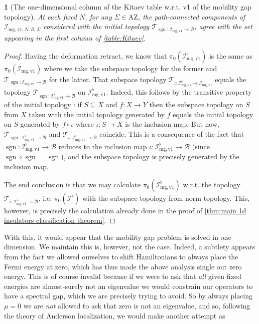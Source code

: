 \documentclass[a4paper,10pt]{article}
\numberwithin{equation}{section}
\theoremstyle{plain}
\theoremstyle{plain}
\theoremstyle{plain}
\newtheorem{cor}[thm]{\protect\corollaryname}
\theoremstyle{plain}
\theoremstyle{plain}
\theoremstyle{remark}
\theoremstyle{definition}
\theoremstyle{plain}
\providecommand{\corollaryname}{Corollary}
\newcommand{\calB}{\mathcal{B}}
\newcommand{\calI}{\mathcal{I}}
\newcommand{\sgn}{\operatorname{sgn}}
\newcommand{\calT}{\mathcal{T}}
\begin{document}
	\begin{cor}[The one-dimensional column of the Kitaev table w.r.t. v1 of the mobility gap topology]\label{thm:main 1d insulators classification theorem for mgv1} At each fixed $N$, for any $\Sigma\in\mathrm{AZ}$, the path-connected components of $\calI_{\mathrm{mg,v1},N,B,\Sigma}$ considered with the initial topology $\calT_{\sgn:\calI_{\mathrm{mg,v1}}\to\calB}$, agree with the set appearing in the first column of \cref{table:Kitaev}.
	\end{cor}
	\begin{proof}
		Having the deformation retract, we know that $\pi_0(\calI^\flat_{\mathrm{mg,v1}})$ is  the same as $\pi_0(\calI_{\mathrm{mg,v1}})$ where we take the subspace topology for the former and $\calT_{\sgn:\calI_{\mathrm{mg,v1}}\to\calB}$ for the latter. That subspace topology $\calT_{\iota:\calI^\flat_{\mathrm{mg,v1}}\to\calI_{\mathrm{mg,v1}}}$ equals the topology $\calT_{\sgn:\calI^\flat_{\mathrm{mg,v1}}\to\calB}$ on $\calI^\flat_{\mathrm{mg,v1}}$. Indeed, this follows by the transitive property of the initial topology \cite[p. 2]{Grothendieck1973}: if $S\subseteq X$ and $f:X\to Y$ then the subspace topology on $S$ from $X$ taken with the initial topology generated by $f$ equals the initial topology on $S$ generated by $f\circ \iota$ where $\iota:S\to X$ is the inclusion map. But now, $\calT_{\sgn:\calI^\flat_{\mathrm{mg,v1}}\to\calB}$ and $\calT_{\iota:\calI^\flat_{\mathrm{mg,v1}}\to\calB}$ coincide. This is a consequence of the fact that $\sgn:\calI_{\mathrm{mg,v1}}^\flat\to\calB$ reduces to the inclusion map $\iota:\calI^\flat_{\mathrm{mg,v1}}\to\calB$ (since $\sgn\circ\sgn=\sgn$), and the subspace topology is precisely generated by the inclusion map.
		
		The end conclusion is that we may calculate $\pi_0(\calI^\flat_{\mathrm{mg,v1}})$ w.r.t. the topology $\calT_{\iota:\calI^\flat_{\mathrm{mg,v1}}\to\calB}$, i.e. $\pi_0(\calI^\flat)$ with the subspace topology from norm topology. This, however, is precisely the calculation already done in the proof of \cref{thm:main 1d insulators classification theorem}.
	\end{proof}
	
	
	With this, it would appear that the mobility gap problem is solved in one dimension. We maintain this is, however, not the case. Indeed, a subtlety appears from the fact we allowed ourselves to shift Hamiltonians to always place the Fermi energy at zero, which has thus made the above analysis single out zero energy. This is of course invalid because if we were to ask that \emph{all} given fixed energies are almost-surely not an eigenvalue we would constrain our operators to have a spectral gap, which we are precisely trying to avoid. So by always placing $\mu=0$ we are \emph{not} allowed to ask that zero is not an eigenvalue, and so, following the theory of Anderson localization, we would make another attempt as
	
\end{document}
